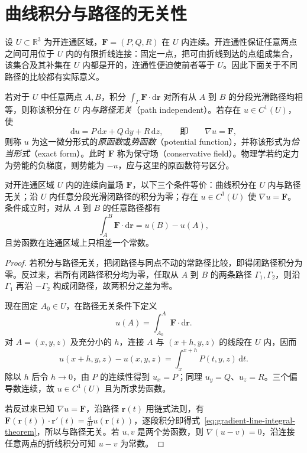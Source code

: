 \documentclass[UTF8,12pt,a4paper,fontset=fandol]{ctexbook}
\begin{document}
\section{曲线积分与路径的无关性}
\label{sec:path-independence-of-line-integrals}

设 $U\subset\mathbb R^3$ 为开连通区域，$\boldsymbol F=(P,Q,R)$ 在 $U$ 内连续。开连通性保证任意两点之间可用位于 $U$ 内的有限折线连接：固定一点，把可由折线到达的点组成集合，该集合及其补集在 $U$ 内都是开的，连通性便迫使前者等于 $U$。因此下面关于不同路径的比较都有实际意义。

\begin{definition}
\label{def:path-independent-and-potential}
若对于 $U$ 中任意两点 $A,B$，积分 $\int_\Gamma\boldsymbol F\cdot\mathrm d\boldsymbol r$ 对所有从 $A$ 到 $B$ 的分段光滑路径均相等，则称该积分在 $U$ 内\emph{与路径无关}（path independent）。若存在 $u\in C^1(U)$，使
\[
    \mathrm du=P\,\mathrm dx+Q\,\mathrm dy+R\,\mathrm dz,
    \qquad\text{即}\qquad \nabla u=\boldsymbol F,
\]
则称 $u$ 为这一微分形式的\emph{原函数}或\emph{势函数}（potential function），并称该形式为\emph{恰当形式}（exact form）。此时 $\boldsymbol F$ 称为保守场（conservative field）。物理学若约定力为势能的负梯度，则势能为 $-u$，应与这里的原函数符号区分。
\end{definition}

\begin{theorem}
\label{thm:path-independence-equivalences}
对开连通区域 $U$ 内的连续向量场 $\boldsymbol F$，以下三个条件等价：曲线积分在 $U$ 内与路径无关；沿 $U$ 内任意分段光滑闭路径的积分为零；存在 $u\in C^1(U)$ 使 $\nabla u=\boldsymbol F$。条件成立时，对从 $A$ 到 $B$ 的任意路径都有
\begin{equation}
\label{eq:gradient-line-integral-theorem}
    \int_A^B\boldsymbol F\cdot\mathrm d\boldsymbol r=u(B)-u(A),
\end{equation}
且势函数在连通区域上只相差一个常数。
\end{theorem}

\begin{proof}
若积分与路径无关，把闭路径与同点不动的常路径比较，即得闭路径积分为零。反过来，若所有闭路径积分均为零，任取从 $A$ 到 $B$ 的两条路径 $\Gamma_1,\Gamma_2$，则沿 $\Gamma_1$ 再沿 $-\Gamma_2$ 构成闭路径，故两积分之差为零。

现在固定 $A_0\in U$，在路径无关条件下定义
\[
    u(A)=\int_{A_0}^A\boldsymbol F\cdot\mathrm d\boldsymbol r.
\]
对 $A=(x,y,z)$ 及充分小的 $h$，连接 $A$ 与 $(x+h,y,z)$ 的线段在 $U$ 内，因而
\[
    u(x+h,y,z)-u(x,y,z)=\int_x^{x+h}P(t,y,z)\,\mathrm dt.
\]
除以 $h$ 后令 $h\to0$，由 $P$ 的连续性得到 $u_x=P$；同理 $u_y=Q$、$u_z=R$。三个偏导数连续，故 $u\in C^1(U)$ 且为所求势函数。

若反过来已知 $\nabla u=\boldsymbol F$，沿路径 $\boldsymbol r(t)$ 用链式法则，有 $\boldsymbol F(\boldsymbol r(t))\cdot\boldsymbol r'(t)=\frac{\mathrm d}{\mathrm dt}u(\boldsymbol r(t))$，逐段积分即得式~\eqref{eq:gradient-line-integral-theorem}，所以与路径无关。若 $u,v$ 是两个势函数，则 $\nabla(u-v)=0$，沿连接任意两点的折线积分可知 $u-v$ 为常数。
\end{proof}
\end{document}

